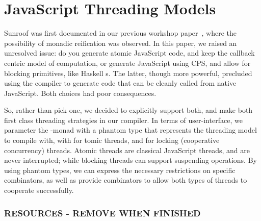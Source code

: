  
\section{JavaScript Threading Models}
\label{sec:threading-models}

Sunroof was first documented in our previous 
workshop paper~\cite{Farmer:12:WebDSLs},
where the possibility of monadic reification was observed.
In this paper, we raised an unresolved issue: do you
generate atomic JavaScript code, and keep the callback
centric model of computation, or generate JavaScript
using CPS, and allow for blocking primitives,
like Haskell s. The latter, though more powerful, 
precluded using the compiler to generate
code that can be cleanly called from native JavaScript.
Both choices had poor consequences.

So, rather than pick one, we decided to explicitly support both,
and make both first class threading strategies in our compiler.
In terms of user-interface, we parameter the \JS-monad
with a phantom type that represents the threading model
to compile with, with  for tomic threads,
and  for locking (cooperative concurrency) threads. 
Atomic threads are classical JavaScript threads, and
are never interrupted; while blocking threads can
support suspending operations. By using phantom
types, we can express the necessary
restrictions on specific combinators, as well
as provide combinators to allow both types of
threads to cooperate successfully.

\subsubsection{RESOURCES - REMOVE WHEN FINISHED}


